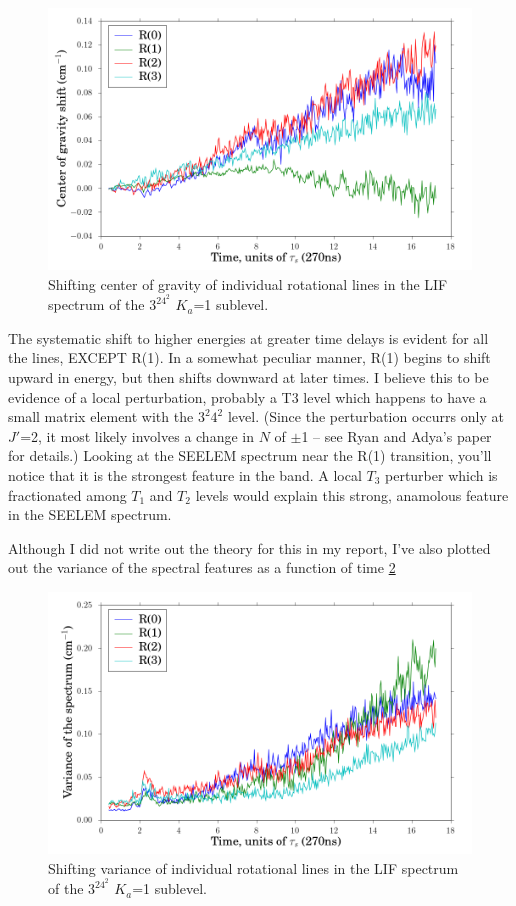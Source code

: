 \documentclass[12pt,draft]{mitthesis}
\begin{document}
\begin{figure}
  \caption{Shifting center of gravity of individual rotational
    lines in the LIF spectrum of the $3^24^2$ $K_a$=1 sublevel.}
  \label{fig:32b2-cog-delay}
  \centering
  \includegraphics[width=6in]{32b2-cog-delay.png}
\end{figure}

The systematic shift to higher energies at greater time delays is
evident for all the lines, EXCEPT R(1).  In a somewhat peculiar
manner, R(1) begins to shift upward in energy, but then shifts
downward at later times. I believe this to be evidence of a local
perturbation, probably a T3 level which happens to have a small matrix
element with the $3^2 4^2$ level.  (Since the perturbation occurrs
only at $J'$=2, it most likely involves a change in $N$ of $\pm$1 --
see Ryan and Adya's paper for details.)  Looking at the SEELEM
spectrum near the R(1) transition, you'll notice that it is the
strongest feature in the band.  A local $T_3$ perturber which is
fractionated among $T_1$ and $T_2$ levels would explain this strong,
anamolous feature in the SEELEM spectrum.

Although I did not write out the theory for this in my report, I've
also plotted out the variance of the spectral features as a function
of time \ref{fig:32b2-var-delay}

\begin{figure}
  \caption{Shifting variance of individual rotational lines in the LIF
    spectrum of the $3^24^2$ $K_a$=1 sublevel.}
  \label{fig:32b2-var-delay}
  \centering
  \includegraphics[width=6in]{32b2-variance-delay.png}
\end{figure}
\end{document}
